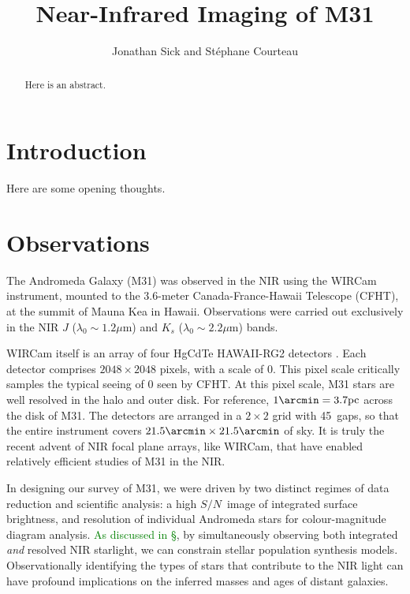 \documentclass[iop]{emulateapj}
\newcommand{\sn}{\ensuremath{S/N}} %
\newcommand{\todo}[1]{\textcolor{green}{#1}}
\begin{document}
\title{Near-Infrared Imaging of M31}
\author{Jonathan Sick and Stéphane Courteau}

\begin{abstract}
Here is an abstract.
\end{abstract}

\section{Introduction}

Here are some opening thoughts.

\section{Observations}
\label{sec:Observations}

The Andromeda Galaxy (M31) was observed in the NIR using the WIRCam instrument, mounted to the 3.6-meter Canada-France-Hawaii Telescope (CFHT), at the summit of Mauna Kea in Hawaii. Observations were carried out exclusively in the NIR $J$ ($\lambda_0 \sim 1.2 \mu\mathrm{m}$) and $K_s$ ($\lambda_0 \sim 2.2 \mu\mathrm{m}$) bands.

WIRCam itself is an array of four HgCdTe HAWAII-RG2 detectors \citep{Puget:2004}. Each detector comprises $2048\times 2048$ pixels, with a scale of 0. This pixel scale critically samples the typical seeing of 0 seen by CFHT. At this pixel scale, M31 stars are well resolved in the halo and outer disk. For reference, $1\arcmin = 3.7\mathrm{pc}$ across the disk of M31. The detectors are arranged in a $2\times 2$ grid with 45\arcsec\ gaps, so that the entire instrument covers $21.5\arcmin \times 21.5\arcmin$ of sky. It is truly the recent advent of NIR focal plane arrays, like WIRCam, that have enabled relatively efficient studies of M31 in the NIR.

In designing our survey of M31, we were driven by two distinct regimes of data reduction and scientific analysis: a high \sn\ image of integrated surface brightness, and resolution of individual Andromeda stars for colour-magnitude diagram analysis. \todo{As discussed in \S}, by simultaneously observing both integrated \emph{and} resolved NIR starlight, we can constrain stellar population synthesis models. Observationally identifying the types of stars that contribute to the NIR light can have profound implications on the inferred masses and ages of distant galaxies.
\end{document}
